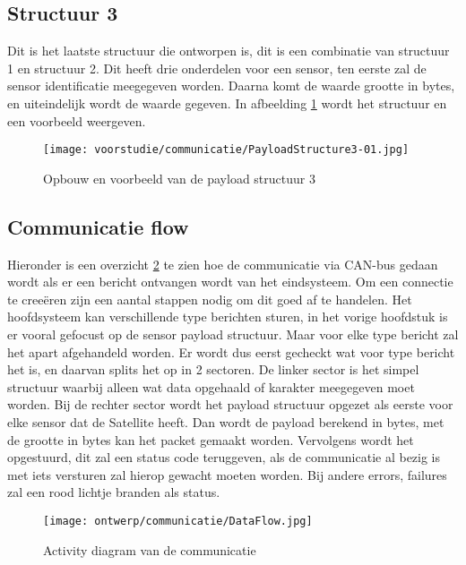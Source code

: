 \subsection{Structuur 3}
Dit is het laatste structuur die ontworpen is, dit is een combinatie van structuur 1 en structuur 2. Dit heeft drie onderdelen voor een sensor, ten eerste zal de sensor identificatie meegegeven worden. Daarna komt de waarde grootte in bytes, en uiteindelijk wordt de waarde gegeven. In afbeelding \ref{fig:Structure3} wordt het structuur en een voorbeeld weergeven.
\begin{figure}[h!]
	\label{fig:Structure3}
	\caption{Opbouw en voorbeeld van de payload structuur 3}
	\texttt{[image: voorstudie/communicatie/PayloadStructure3-01.jpg]}
\end{figure}

\newpage
\subsection{Communicatie flow}
Hieronder is een overzicht \ref{fig:comflow} te zien hoe de communicatie via CAN-bus gedaan wordt als er een bericht ontvangen wordt van het eindsysteem. Om een connectie te creeëren zijn een aantal stappen nodig om dit goed af te handelen. Het hoofdsysteem kan verschillende type berichten sturen, in het vorige hoofdstuk is er vooral gefocust op de sensor payload structuur. Maar voor elke type bericht zal het apart afgehandeld worden. Er wordt dus eerst gecheckt wat voor type bericht het is, en daarvan splits het op in 2 sectoren. De linker sector is het simpel structuur waarbij alleen wat data opgehaald of karakter meegegeven moet worden. Bij de rechter sector wordt het payload structuur opgezet als eerste voor elke sensor dat de Satellite heeft. Dan wordt de payload berekend in bytes, met de grootte in bytes kan het packet gemaakt worden. Vervolgens wordt het opgestuurd, dit zal een status code teruggeven, als de communicatie al bezig is met iets versturen zal hierop gewacht moeten worden. Bij andere errors, failures zal een rood lichtje branden als status.
\begin{figure}[h!]
	\centering
	\label{fig:comflow}
	\caption{Activity diagram van de communicatie}
	\texttt{[image: ontwerp/communicatie/DataFlow.jpg]}
\end{figure}

\newpage
